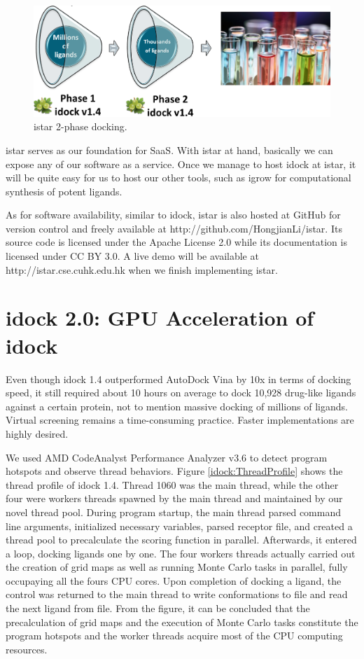 \begin{figure}
\centering
\includegraphics[width=\linewidth]{istar/2PhaseDocking.png}
\caption{istar 2-phase docking.}
\label{istar:2PhaseDocking}
\end{figure}

istar serves as our foundation for SaaS. With istar at hand, basically we can expose any of our software as a service. Once we manage to host idock at istar, it will be quite easy for us to host our other tools, such as igrow for computational synthesis of potent ligands.

As for software availability, similar to idock, istar is also hosted at GitHub for version control and freely available at http://github.com/HongjianLi/istar. Its source code is licensed under the Apache License 2.0 while its documentation is licensed under CC BY 3.0. A live demo will be available at http://istar.cse.cuhk.edu.hk when we finish implementing istar.

\section{idock 2.0: GPU Acceleration of idock}

Even though idock 1.4 outperformed AutoDock Vina by 10x in terms of docking speed, it still required about 10 hours on average to dock 10,928 drug-like ligands against a certain protein, not to mention massive docking of millions of ligands. Virtual screening remains a time-consuming practice. Faster implementations are highly desired.

We used AMD CodeAnalyst Performance Analyzer v3.6 to detect program hotspots and observe thread behaviors. Figure \ref{idock:ThreadProfile} shows the thread profile of idock 1.4. Thread 1060 was the main thread, while the other four were workers threads spawned by the main thread and maintained by our novel thread pool. During program startup, the main thread parsed command line arguments, initialized necessary variables, parsed receptor file, and created a thread pool to precalculate the scoring function in parallel. Afterwards, it entered a loop, docking ligands one by one. The four workers threads actually carried out the creation of grid maps as well as running Monte Carlo tasks in parallel, fully occupaying all the fours CPU cores. Upon completion of docking a ligand, the control was returned to the main thread to write conformations to file and read the next ligand from file. From the figure, it can be concluded that the precalculation of grid maps and the execution of Monte Carlo tasks constitute the program hotspots and the worker threads acquire most of the CPU computing resources.

